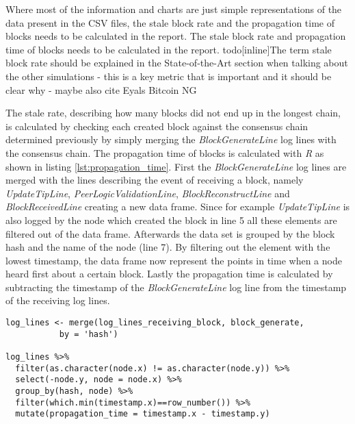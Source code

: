 Where most of the information and charts are just simple representations of the data present in the CSV files, the stale block rate and the propagation time of blocks needs to be calculated in the report.
	The stale block rate and propagation time of blocks needs to be calculated in the report.
todo[inline]{The term stale block rate should be explained in the State-of-the-Art section when talking about the other simulations - this is a key metric that is important and it should be clear why - maybe also cite Eyals Bitcoin NG}

The stale rate, describing how many blocks did not end up in the longest chain, is calculated by checking each created block against the consensus chain determined previously by simply merging the \textit{BlockGenerateLine} log lines with the consensus chain.
The propagation time of blocks is calculated with \textit{R} as shown in listing \ref{lst:propagation_time}.
First the \textit{BlockGenerateLine} log lines are merged with the lines describing the event of receiving a block, namely	\textit{UpdateTipLine}, \textit{PeerLogicValidationLine}, \textit{BlockReconstructLine} and \textit{BlockReceivedLine} creating a new data frame.
Since for example \textit{UpdateTipLine} is also logged by the node which created the block in line 5 all these elements are filtered out of the data frame.
Afterwards the data set is grouped by the block hash and the name of the node (line 7).
By filtering out the element with the lowest timestamp, the data frame now represent the points in time when a node heard first about a certain block.
Lastly the propagation time is calculated by subtracting the timestamp of the \textit{BlockGenerateLine} log line from the timestamp of the receiving log lines.

\begin{minipage}{\linewidth}
\begin{lstlisting}[caption=Calculation of propagation time with \textit{R}, label={lst:propagation_time}, basicstyle=\ttfamily, captionpos=b]
log_lines <- merge(log_lines_receiving_block, block_generate,
		   by = 'hash')

log_lines %>%
  filter(as.character(node.x) != as.character(node.y)) %>%
  select(-node.y, node = node.x) %>%
  group_by(hash, node) %>%
  filter(which.min(timestamp.x)==row_number()) %>%
  mutate(propagation_time = timestamp.x - timestamp.y)
\end{lstlisting}
\end{minipage}
 
